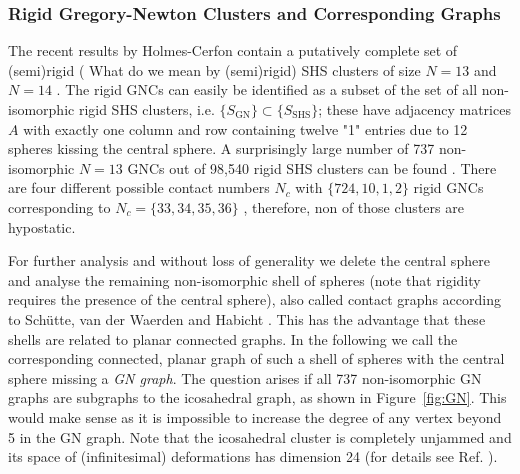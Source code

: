 \subsubsection{Rigid Gregory-Newton Clusters and Corresponding Graphs}

The recent results by Holmes-Cerfon contain a putatively complete set of
(semi)rigid {(\color{red} What do we mean by (semi)rigid)} SHS clusters of size $N=13$ and $N=14$
\autocite{Holmes-Cerfon_EnumeratingRigidSphere_2016}. The rigid GNCs can easily be
identified as a subset of the set of all non-isomorphic rigid SHS clusters,
i.e. $\{ S_\mathrm{GN}\}\subset \{ S_\mathrm{SHS}\}$; these have adjacency matrices
$A$ with exactly one column and row containing twelve "1" entries due to 12
spheres kissing the central sphere. A surprisingly large number of 737
non-isomorphic $N = 13$ GNCs out of 98,540 rigid SHS clusters can be found
\autocite{Trombach_stickyhardsphereLennardJonestypeclusters_2018}. There are four different possible contact numbers $N_c$
with $\{724,10,1,2\}$ rigid GNCs corresponding to $N_c=\{33,34,35,36\}$
\autocite{Robinson_Arrangement24points_1961}, therefore, non of those clusters are hypostatic.

For further analysis and without loss of generality we delete the central
sphere and analyse the remaining non-isomorphic shell of spheres (note that
rigidity requires the presence of the central sphere), also called contact
graphs according to Sch{\"u}tte, van der Waerden and Habicht
\autocite{Schuette_AufwelcherKugel_1951}. This has the advantage that these shells are related to
planar connected graphs. In the following we call the corresponding connected,
planar graph of such a shell of spheres with the central sphere missing a
\textit{GN graph}. The question arises if all 737 non-isomorphic GN graphs are
subgraphs to the icosahedral graph, as shown in Figure~\ref{fig:GN}. This would
make sense as it is impossible to increase the degree of any vertex beyond 5 in
the GN graph. Note that the icosahedral cluster is completely unjammed and its
space of (infinitesimal) deformations has dimension 24 (for details see
Ref. \cite{Kusner_ConfigurationSpacesEqual_2016}).

